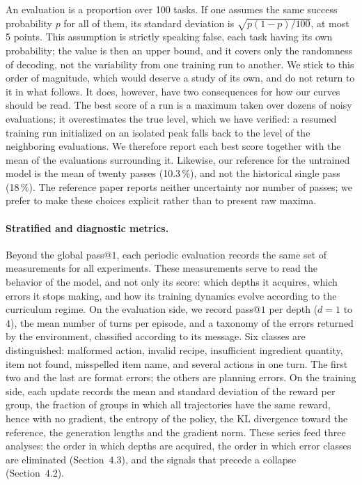 \documentclass[11pt,a4paper]{article}
\begin{document}
An evaluation is a proportion over 100 tasks. If one assumes the same success probability $p$ for all of them, its standard deviation is $\sqrt{p(1-p)/100}$, at most 5 points. This assumption is strictly speaking false, each task having its own probability; the value is then an upper bound, and it covers only the randomness of decoding, not the variability from one training run to another. We stick to this order of magnitude, which would deserve a study of its own, and do not return to it in what follows. It does, however, have two consequences for how our curves should be read. The best score of a run is a maximum taken over dozens of noisy evaluations; it overestimates the true level, which we have verified: a resumed training run initialized on an isolated peak falls back to the level of the neighboring evaluations. We therefore report each best score together with the mean of the evaluations surrounding it. Likewise, our reference for the untrained model is the mean of twenty passes (10.3\,\%), and not the historical single pass (18\,\%). The reference paper reports neither uncertainty nor number of passes; we prefer to make these choices explicit rather than to present raw maxima.


\paragraph{Stratified and diagnostic metrics.} Beyond the global pass@$1$, each periodic evaluation records the same set of measurements for all experiments. These measurements serve to read the behavior of the model, and not only its score: which depths it acquires, which errors it stops making, and how its training dynamics evolve according to the curriculum regime. On the evaluation side, we record pass@$1$ per depth ($d=1$ to $4$), the mean number of turns per episode, and a taxonomy of the errors returned by the environment, classified according to its message. Six classes are distinguished: malformed action, invalid recipe, insufficient ingredient quantity, item not found, misspelled item name, and several actions in one turn. The first two and the last are format errors; the others are planning errors. On the training side, each update records the mean and standard deviation of the reward per group, the fraction of groups in which all trajectories have the same reward, hence with no gradient, the entropy of the policy, the KL divergence toward the reference, the generation lengths and the gradient norm. These series feed three analyses: the order in which depths are acquired, the order in which error classes are eliminated (Section~4.3), and the signals that precede a collapse (Section~4.2).
\end{document}
